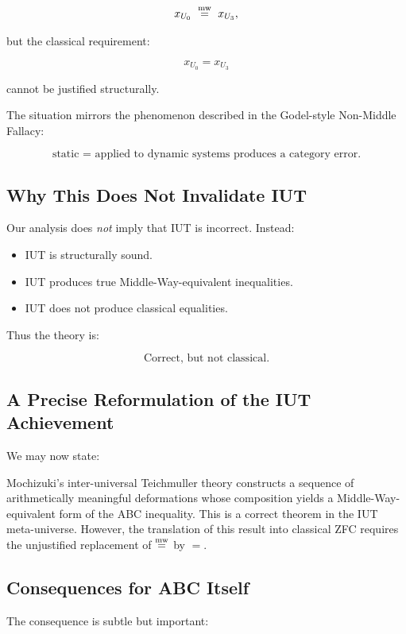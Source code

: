 \documentclass[11pt]{article}
\begin{document}
\[
x_{U_0} \ \mathrel{\overset{\mathrm{mw}}{=}}\ x_{U_3},
\]

but the classical requirement:

\[
x_{U_0} = x_{U_3}
\]

cannot be justified structurally.

The situation mirrors the phenomenon described in the Godel-style
Non-Middle Fallacy:

\[
\text{static = applied to dynamic systems produces a category error}.
\]

\subsection{Why This Does Not Invalidate IUT}

Our analysis does \emph{not} imply that IUT is incorrect. Instead:

\begin{itemize}
\item IUT is structurally sound.
\item IUT produces true Middle-Way-equivalent inequalities.
\item IUT does not produce classical equalities.
\end{itemize}

Thus the theory is:

\[
\text{Correct, but not classical.}
\]

\subsection{A Precise Reformulation of the IUT Achievement}

We may now state:

\begin{theorem}
Mochizuki's inter-universal Teichmuller theory constructs a sequence of
arithmetically meaningful deformations whose composition yields a
Middle-Way-equivalent form of the ABC inequality. This is a correct
theorem in the IUT meta-universe. However, the translation of this
result into classical ZFC requires the unjustified replacement of
$\mathrel{\overset{\mathrm{mw}}{=}}$ by $=$.
\end{theorem}

\subsection{Consequences for ABC Itself}

The consequence is subtle but important:
\end{document}
